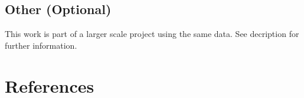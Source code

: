 \documentclass[]{article}
\begin{document}
\hypertarget{other-optional}{%
\subsection{Other (Optional)}\label{other-optional}}

This work is part of a larger scale project using the same data. See
decription for further information.

\hypertarget{references}{%
\section{References}\label{references}}

\hypertarget{section}{%
\subsection{}\label{section}}

\vspace{-2pc}
\setlength{\parindent}{-0.5in}
\setlength{\leftskip}{-1in}
\setlength{\parskip}{8pt}

\noindent
\end{document}
